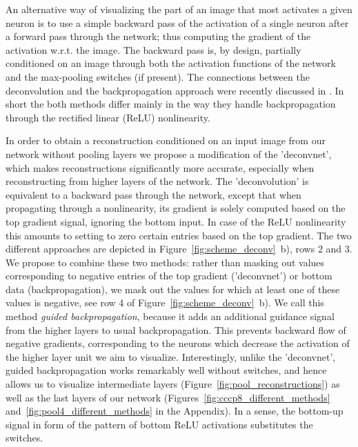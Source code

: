 \documentclass{article} %
\begin{document}

An alternative way of visualizing the part of an image that most activates a given neuron is to use a simple backward pass of the activation of a single neuron after a forward pass through the network; thus computing the gradient of the activation w.r.t. the image. The backward pass is, by design, partially conditioned on an image through both the activation functions of the network and the max-pooling switches (if present). The connections between the deconvolution and the backpropagation approach were recently discussed in \citet{Simonyan_arxiv2014}. In short the both methods differ mainly in the way they handle backpropagation through the rectified linear (ReLU) nonlinearity.

In order to obtain a reconstruction conditioned on an input image from our network without pooling layers we propose a modification of the 'deconvnet', which makes reconstructions significantly more accurate, especially when reconstructing from higher layers of the network. The 'deconvolution' is equivalent to a backward pass through the network, except that when propagating through a nonlinearity, its gradient is solely computed based on the top gradient signal, ignoring the bottom input. In case of the ReLU nonlinearity this amounts to setting to zero certain entries based on the top gradient. The two different approaches are depicted in Figure~\ref{fig:scheme_deconv}~b), rows 2 and 3. We propose to combine these two methods: rather than masking out values corresponding to negative entries of the top gradient ('deconvnet') or bottom data (backpropagation), we mask out the values for which at least one of these values is negative, see row 4 of Figure~\ref{fig:scheme_deconv}~b). We call this method \emph{guided backpropagation}, because it adds an additional guidance signal from the higher layers to usual backpropagation. This prevents backward flow of negative gradients, corresponding to the neurons which decrease the activation of the higher layer unit we aim to visualize. Interestingly, unlike the 'deconvnet', guided backpropagation works remarkably well without switches, and hence allows us to visualize intermediate layers (Figure~\ref{fig:pool_reconstructions}) as well as the last layers of our network (Figures~\ref{fig:cccp8_different_methods} and~\ref{fig:pool4_different_methods} in the Appendix). In a sense, the bottom-up signal in form of the pattern of bottom ReLU activations substitutes the switches. 
\end{document}
